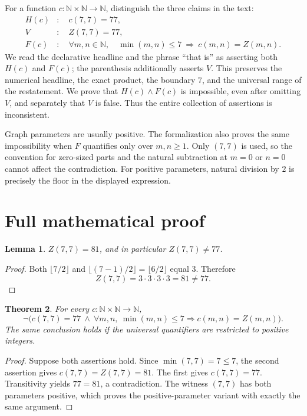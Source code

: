 \documentclass[11pt]{article}
\newtheorem{theorem}{Theorem}
\newtheorem{lemma}[theorem]{Lemma}
\newcommand{\N}{\mathbb{N}}
\begin{document}
For a function $c:\N\times\N\longrightarrow\N$, distinguish the three
claims in the text:
\begin{align*}
H(c)&:\quad c(7,7)=77,\\
V&:\quad Z(7,7)=77,\\
F(c)&:\quad \forall m,n\in\N,\quad
\min(m,n)\leq7\ \Longrightarrow\ c(m,n)=Z(m,n).
\end{align*}
We read the declarative headline and the phrase ``that is'' as asserting
both $H(c)$ and $F(c)$; the parenthesis additionally asserts $V$.
This preserves the numerical headline, the exact product, the boundary
$7$, and the universal range of the restatement. We prove that
$H(c)\land F(c)$ is impossible, even after omitting $V$, and separately
that $V$ is false. Thus the entire collection of assertions is inconsistent.

Graph parameters are usually positive. The formalization also proves
the same impossibility when $F$ quantifies only over $m,n\geq1$.
Only $(7,7)$ is used, so the convention for zero-sized parts and the
natural subtraction at $m=0$ or $n=0$ cannot affect the contradiction.
For positive parameters, natural division by $2$ is precisely the floor
in the displayed expression.

\section{Full mathematical proof}
\begin{lemma}
$Z(7,7)=81$, and in particular $Z(7,7)\ne77$.
\end{lemma}
\begin{proof}
Both $\lfloor7/2\rfloor$ and $\lfloor(7-1)/2\rfloor
=\lfloor6/2\rfloor$ equal $3$. Therefore
\[
Z(7,7)=3\cdot3\cdot3\cdot3=81\ne77.
\]
\end{proof}

\begin{theorem}\label{thm:main}
For every $c:\N\times\N\to\N$,
\[
\neg\bigl(c(7,7)=77\ \land\
\forall m,n,\ \min(m,n)\leq7\Longrightarrow c(m,n)=Z(m,n)\bigr).
\]
The same conclusion holds if the universal quantifiers are restricted
to positive integers.
\end{theorem}
\begin{proof}
Suppose both assertions hold. Since $\min(7,7)=7\leq7$, the second
assertion gives $c(7,7)=Z(7,7)=81$. The first gives $c(7,7)=77$.
Transitivity yields $77=81$, a contradiction. The witness $(7,7)$ has
both parameters positive, which proves the positive-parameter variant
with exactly the same argument.
\end{proof}
\end{document}
